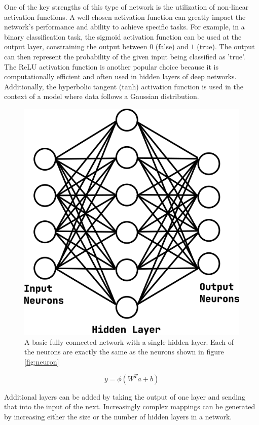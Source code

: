 One of the key strengths of this type of network is the utilization of non-linear activation functions. A well-chosen activation function can greatly impact the network's performance and ability to achieve specific tasks. For example, in a binary classification task, the sigmoid activation function can be used at the output layer, constraining the output between $0$ (false) and $1$ (true). The output can then represent the probability of the given input being classified as 'true'. The ReLU activation function is another popular choice because it is computationally efficient and often used in hidden layers of deep networks. Additionally, the hyperbolic tangent (tanh) activation function is used in the context of a model where data follows a Gaussian distribution.

\begin{figure}[h!]
    \centering
    \includegraphics[width=0.7\linewidth]{figs/background/png/fcn.png}
    \caption{A basic fully connected network with a single hidden layer. Each of the neurons are exactly the same as the neurons shown in figure \ref{fig:neuron}}
    \label{fig:fcn}
\end{figure}

\begin{equation}
    y = \phi(W^{T}a + b)
    \label{eq:fcn}
\end{equation}

Additional layers can be added by taking the output of one layer and sending that into the input of the next. Increasingly complex mappings can be generated by increasing either the size or the number of hidden layers in a network.

